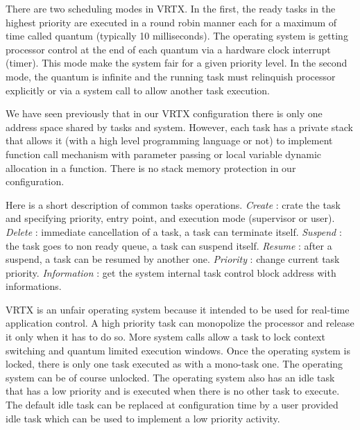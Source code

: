 \documentclass[10pt]{report}
\begin{document}
There are two scheduling modes in VRTX. In the first, the ready tasks in the highest priority are executed in a round robin
manner each for a maximum of time called quantum (typically 10 milliseconds). The operating system is getting processor
control at the end of each quantum via a hardware clock interrupt (timer). This mode make the system fair for a given
priority level. In the second mode, the quantum is infinite and the running task must relinquish processor explicitly or via
a system call to allow another task execution.

We have seen previously that in our VRTX configuration there is only one address space shared by tasks and system. However,
each task has a private stack that allows it (with a high level programming language or not) to implement function call
mechanism with parameter passing or local variable dynamic allocation in a function. There is no stack memory protection in
our configuration.

Here is a short description of common tasks operations. {\em Create} : crate the task and specifying priority, entry point,
and execution mode (supervisor or user). {\em Delete} : immediate cancellation of a task, a task can terminate itself.
{\em Suspend} : the task goes to non ready queue, a task can suspend itself. {\em Resume} : after a suspend, a task can be
resumed by another one. {\em Priority} : change current task priority. {\em Information} : get the system internal task control
block address with informations.

VRTX is an unfair operating system because it intended to be used for real-time application control. A high priority task
can monopolize the processor and release it only when it has to do so. More system calls allow a task to lock context switching
and quantum limited execution windows. Once the operating system is locked, there is only one task executed as with a mono-task
one. The operating system can be of course unlocked. The operating system also has an idle task that has a low priority and is
executed when there is no other task to execute. The default idle task can be replaced at configuration time by a user
provided idle task which can be used to implement a low priority activity.
\end{document}
